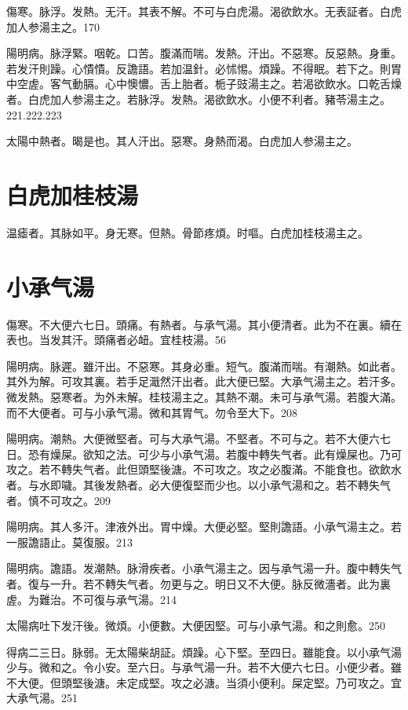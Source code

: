 傷寒。脉浮。发熱。无汗。其表不解。不可与白虎湯。渴欲飲水。无表証者。白虎{\khaaitp 加人参}湯主之。170

陽明病。脉浮緊。咽乾。口苦。腹滿而喘。发熱。汗出。不惡寒。反惡熱。身重。若发汗則躁。心憒憒。反譫語。若加温針。必怵惕。煩躁。不得眠。若下之。則胃中空虗。客气動膈。心中懊憹。舌上胎者。栀子{\khaaitp 豉}湯主之。若渴欲飲水。口乾舌燥者。白虎{\khaaitp 加人参}湯主之。若脉浮。发熱。渴欲飲水。小便不利者。豬苓湯主之。221.222.223

太陽中熱者。暍是也。其人汗出。惡寒。身熱而渴。白虎{\khaaitp 加人参}湯主之。

\section{白虎加桂枝湯}

温瘧者。其脉如平。身无寒。但熱。骨節疼煩。时嘔。白虎加桂枝湯主之。

\section{小承气湯}

傷寒。不大便六七日。頭痛。有熱者。与承气湯。其小便清者。此为不在裏。續在表也。当发其汗。頭痛者必衄。宜桂枝湯。56

陽明病。脉遲。雖汗出。不惡寒。其身必重。短气。腹滿而喘。有潮熱。如此者。其外为解。可攻其裏。若手足濈然汗出者。此大便已堅。{\khaaitp 大}承气湯主之。若汗多。微发熱。惡寒者。为外未解。{\khaaitp 桂枝湯主之。}其熱不潮。未可与承气湯。若腹大滿。而不大便者。可与小承气湯。微和其胃气。勿令至大下。208

陽明病。潮熱。大便微堅者。可与{\khaaitp 大}承气湯。不堅者。不可与之。若不大便六七日。恐有燥屎。欲知之法。可少与小承气湯。若腹中轉失气者。此有燥屎也。乃可攻之。若不轉失气者。此但頭堅後溏。不可攻之。攻之必腹滿。不能食也。欲飲水者。与水即噦。其後发熱者。必大便復堅而少也。以小承气湯和之。若不轉失气者。慎不可攻之。209

陽明病。其人多汗。津液外出。胃中燥。大便必堅。堅則譫語。{\khaaitp 小}承气湯主之。{\khaaitp 若一服譫語止。莫復服。}213

陽明病。譫語。发潮熱。脉滑疾者。{\khaaitp 小}承气湯主之。因与承气湯一升。腹中轉失气者。復与一升。若不轉失气者。勿更与之。明日又不大便。脉反微濇者。此为裏虗。为難治。不可復与承气湯。214

太陽病吐下发汗後。微煩。小便數。大便因堅。可与小承气湯。和之則愈。250

得病二三日。脉弱。无太陽柴胡証。煩躁。心下堅。至四日。雖能食。以{\khaaitp 小}承气湯少与。微和之。令小安。至六日。与承气湯一升。若不大便六七日。小便少者。雖不大便。但頭堅後溏。未定成堅。攻之必溏。当須小便利。屎定堅。乃可攻之。宜{\khaaitp 大}承气湯。251

